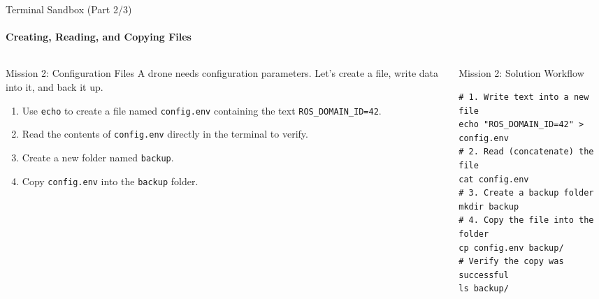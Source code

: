\begin{frame}[fragile]{Terminal Sandbox (Part 2/3)}
\framesubtitle{Creating, Reading, and Copying Files}

\footnotesize

\begin{columns}[T,onlytextwidth]

    \begin{column}{0.48\textwidth}
        \begin{exampleblock}{Mission 2: Configuration Files}
            A drone needs configuration parameters. Let's create a file, write data into it, and back it up.
            \begin{enumerate}
                \setlength{\itemsep}{0.2em}
                \item Use \texttt{echo} to create a file named \texttt{config.env} containing the text \texttt{ROS\_DOMAIN\_ID=42}.
                \item Read the contents of \texttt{config.env} directly in the terminal to verify.
                \item Create a new folder named \texttt{backup}.
                \item Copy \texttt{config.env} into the \texttt{backup} folder.
            \end{enumerate}
        \end{exampleblock}
    \end{column}

    \pause
    \begin{column}{0.48\textwidth}
        \begin{block}{Mission 2: Solution Workflow}
            
\begin{verbatim}
# 1. Write text into a new file
echo "ROS_DOMAIN_ID=42" > config.env
# 2. Read (concatenate) the file
cat config.env
# 3. Create a backup folder
mkdir backup
# 4. Copy the file into the folder
cp config.env backup/
# Verify the copy was successful
ls backup/
\end{verbatim}
        \end{block}
    \end{column}

\end{columns}
\end{frame}


